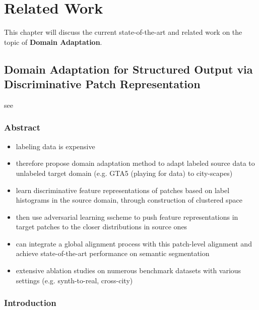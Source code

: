 \chapter{Related Work}
\label{sec:related_work}

This chapter will discuss the current state-of-the-art and related work on the topic of \textbf{Domain Adaptation}.


\section{Domain Adaptation for Structured Output via Discriminative Patch Representation}

see \cite{Tsai2019DomainAF}

\subsection{Abstract}
\begin{itemize}
	\item labeling data is expensive
	\item therefore propose domain adaptation method to adapt labeled source data to unlabeled target domain (e.g. GTA5 (playing for data) to city-scapes)
	\item learn discriminative feature representations of patches based on label histograms in the source domain, through construction of clustered space
	\item then use adversarial learning sscheme to push feature representations in target patches to the closer distributions in source ones
	\item can integrate a global alignment process with this patch-level alignment and achieve state-of-the-art performance on semantic segmentation
	\item extensive ablation studies on numerous benchmark datasets with various settings (e.g. synth-to-real, cross-city)
\end{itemize}

\subsection{Introduction}

